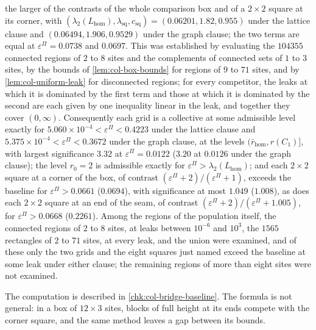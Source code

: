 \begin{observation}
the larger of the contrasts of the whole comparison box and of a $2\times2$ square at its corner, with $(\lambda_2(L_{\mathrm{hom}}),\lambda_{\mathrm{sq}},c_{\mathrm{sq}})=(0.06201,1.82,0.955)$ under the lattice clause and $(0.06494,1.906,0.9529)$ under the graph clause; the two terms are equal at $\varepsilon^\Pi=0.0738$ and $0.0697$. This was established by evaluating the $104355$ connected regions of $2$ to $8$ sites and the complements of connected sets of $1$ to $3$ sites, by the bounds of \cref{lem:col-box-bounds} for regions of $9$ to $71$ sites, and by \cref{lem:col-uniform-leak} for disconnected regions; for every competitor, the leaks at which it is dominated by the first term and those at which it is dominated by the second are each given by one inequality linear in the leak, and together they cover $(0,\infty)$. Consequently each grid is a collective at some admissible level exactly for $5.060\times10^{-4}<\varepsilon^\Pi<0.4223$ under the lattice clause and $5.375\times10^{-4}<\varepsilon^\Pi<0.3672$ under the graph clause, at the levels $(\bar r_{\mathrm{hom}},r(C_1)]$, with largest significance $3.32$ at $\varepsilon^\Pi=0.0122$ ($3.20$ at $0.0126$ under the graph clause); the level $r_0=2$ is admissible exactly for $\varepsilon^\Pi>\lambda_2(L_{\mathrm{hom}})$; and each $2\times2$ square at a corner of the box, of contrast $(\varepsilon^\Pi+2)/(\varepsilon^\Pi+1)$, exceeds the baseline for $\varepsilon^\Pi>0.0661$ ($0.0694$), with significance at most $1.049$ ($1.008$), as does each $2\times2$ square at an end of the seam, of contrast $(\varepsilon^\Pi+2)/(\varepsilon^\Pi+1.005)$, for $\varepsilon^\Pi>0.0668$ ($0.2261$). Among the regions of the population itself, the connected regions of $2$ to $8$ sites, at leaks between $10^{-6}$ and $10^3$, the $1565$ rectangles of $2$ to $71$ sites, at every leak, and the union were examined, and of these only the two grids and the eight squares just named exceed the baseline at some leak under either clause; the remaining regions of more than eight sites were not examined.
\end{observation}
The computation is described in \cref{chk:col-bridge-baseline}. The formula is not general: in a box of $12\times3$ sites, blocks of full height at its ends compete with the corner square, and the same method leaves a gap between its bounds.

